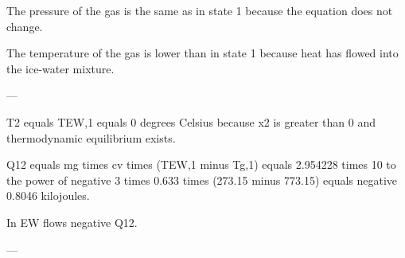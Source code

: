 The pressure of the gas is the same as in state 1 because the equation does not change.  

The temperature of the gas is lower than in state 1 because heat has flowed into the ice-water mixture.  

---

T2 equals TEW,1 equals 0 degrees Celsius because x2 is greater than 0 and thermodynamic equilibrium exists.  

Q12 equals mg times cv times (TEW,1 minus Tg,1) equals 2.954228 times 10 to the power of negative 3 times 0.633 times (273.15 minus 773.15) equals negative 0.8046 kilojoules.  

In EW flows negative Q12.  

---
